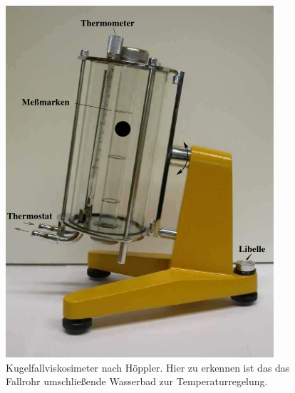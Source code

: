 \begin{figure}
  \centering
  \includegraphics[scale = 0.75]{./logos/Viskosimeter.PNG}
  \caption{Kugelfallviskosimeter nach Höppler. Hier zu erkennen ist das das Fallrohr umschließende Wasserbad zur Temperaturregelung. \cite{Anleitung}}
  \label{fig:Viskosimeter}
\end{figure}
